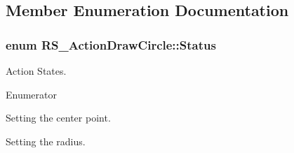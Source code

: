 \subsection{Member Enumeration Documentation}
\hypertarget{classRS__ActionDrawCircle_ade536243e0f8abb2e15795591b9c2f0d}{
\subsubsection[{Status}]{\setlength{\rightskip}{0pt plus 5cm}enum {\bf R\-S\-\_\-\-Action\-Draw\-Circle\-::\-Status}}}\label{classRS__ActionDrawCircle_ade536243e0f8abb2e15795591b9c2f0d}
Action States. \begin{Desc}
\item[Enumerator]\par
\begin{description}
\item[{\em 
\hypertarget{classRS__ActionDrawCircle_ade536243e0f8abb2e15795591b9c2f0da07fab13389e7a57997040dd0beb64b24}{Set\-Center}\label{classRS__ActionDrawCircle_ade536243e0f8abb2e15795591b9c2f0da07fab13389e7a57997040dd0beb64b24}
}]Setting the center point. \item[{\em 
\hypertarget{classRS__ActionDrawCircle_ade536243e0f8abb2e15795591b9c2f0dae64f4d403f7705b2fc622feac276c2e2}{Set\-Radius}\label{classRS__ActionDrawCircle_ade536243e0f8abb2e15795591b9c2f0dae64f4d403f7705b2fc622feac276c2e2}
}]Setting the radius. \end{description}
\end{Desc}


